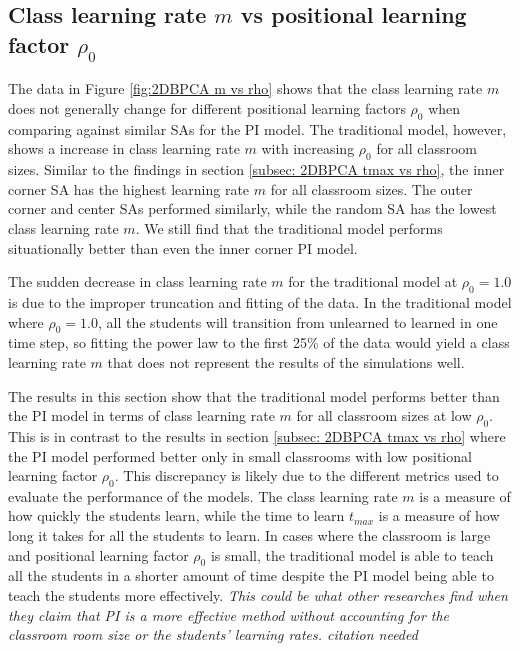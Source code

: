 \newpage

\subsection{Class learning rate $m$ vs positional learning factor $\rho_0$}

The data in Figure \ref{fig:2DBPCA m vs rho} shows that the class learning rate $m$ does not generally change for different positional learning factors $\rho_0$ when comparing against similar SAs for the PI model. 
The traditional model, however, shows a increase in class learning rate $m$ with increasing $\rho_0$ for all classroom sizes. 
Similar to the findings in section \ref{subsec: 2DBPCA tmax vs rho}, the inner corner SA has the highest learning rate $m$ for all classroom sizes. 
The outer corner and center SAs performed similarly, while the random SA has the lowest class learning rate $m$. We still find that the traditional model performs situationally better than even the inner corner PI model. 

The sudden decrease in class learning rate $m$ for the traditional model at $\rho_0 = 1.0$ is due to the improper truncation and fitting of the data. 
In the traditional model where $\rho_0 = 1.0$, all the students will transition from unlearned to learned in one time step, so fitting the power law to the first 25\% of the data would yield a class learning rate $m$ that does not represent the results of the simulations well.

The results in this section show that the traditional model performs better than the PI model in terms of class learning rate $m$ for all classroom sizes at low $\rho_0$. 
This is in contrast to the results in section \ref{subsec: 2DBPCA tmax vs rho} where the PI model performed better only in small classrooms with low positional learning factor $\rho_0$. 
This discrepancy is likely due to the different metrics used to evaluate the performance of the models. The class learning rate $m$ is a measure of how quickly the students learn, while the time to learn $t_{max}$ is a measure of how long it takes for all the students to learn. 
In cases where the classroom is large and positional learning factor $\rho_0$ is small, the traditional model is able to teach all the students in a shorter amount of time despite the PI model being able to teach the students more effectively. 
\textit{This could be what other researches find when they claim that PI is a more effective method without accounting for the classroom room size or the students' learning rates. citation needed}

